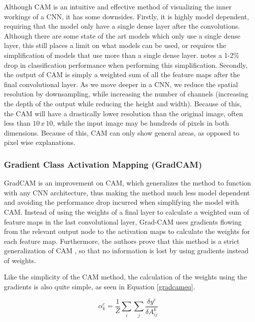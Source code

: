 \documentclass[UKenglish]{uiomasterthesis} %
\theoremstyle{definition}
\begin{document}
Although CAM is an intuitive and effective method of visualizing the inner workings of a CNN, it has some downsides. Firstly, it is highly model dependent, requiring that the model only have a single dense layer after the convolutions. Although there are some state of the art models which only use a single dense layer, this still places a limit on what models can be used, or requires the simplification of models that use more than a single dense layer. \cite[4]{cam} notes a 1-2\% drop in classification performance when performing this simplification. Secondly, the output of CAM is simply a weighted sum of all the feature maps after the final convolutional layer. As we move deeper in a CNN, we reduce the spatial resolution by downsampling, while increasing the number of channels (increasing the depth of the output while reducing the height and width). Because of this, the CAM will have a drastically lower resolution than the original image, often less than $10 \, x \, 10$, while the input image may be hundreds of pixels in both dimensions. Because of this, CAM can only show general areas, as opposed to pixel wise explanations.
\\

\subsubsection{Gradient Class Activation Mapping (GradCAM)} \label{section:gradcam}

GradCAM \cite{gradcam} is an improvement on CAM, which generalizes the method to function with any CNN architecture, thus making the method much less model dependent and avoiding the performance drop incurred when simplifying the model with CAM. Instead of using the weights of a final layer to calculate a weighted sum of feature maps in the last convolutional layer, Grad-CAM uses gradients flowing from the relevant output node to the activation maps to calculate the weights for each feature map. Furthermore, the authors prove that this method is a strict generalization of CAM \cite[5]{gradcam}, so that no information is lost by using gradients instead of weights.

Like the simplicity of the CAM method, the calculation of the weights using the gradients is also quite simple, as seen in Equation \ref{gradcameq}.

\begin{equation}
\alpha^c_k = \frac{1}{Z} \sum_i \sum_j \frac{\delta y^c}{\delta A^k_{ij}}
\label{gradcameq}
\end{equation}
\end{document}
